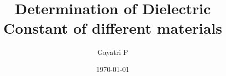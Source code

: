 \documentclass[reprint,amsmath,amssymb,aps]{revtex4-2}
\begin{document}
    \title{Determination of Dielectric Constant of different materials}

    \author{Gayatri P}
    \date{\today}

    
    \maketitle

    
    
    
    
    
    
     
    
    \nocite{*}
\end{document}
